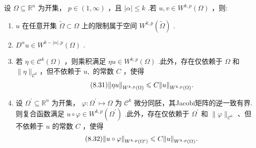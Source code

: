 \begin{theorem}[弱导数的性质]\label{thm:weak-derivative-properties}
设 $\Omega  \subseteq  {\mathbb{R}}^{n}$ 为开集， $p \in  \left(  {1,\infty }\right)$ ，且 $\left| \alpha \right|  \leq  k$ .若 $u,v \in  {W}^{k,p}\left( \Omega \right)$ ，则:
\begin{enumerate}
    \item $u$ 在任意开集 $\widetilde{\Omega } \subset  \Omega$ 上的限制属于空间 ${W}^{k,p}\left( \widetilde{\Omega }\right)$ .
    \item ${D}^{\alpha }u \in  {W}^{k - \left| \alpha \right| ,p}\left( \Omega \right)$ .
    \item 若 $\eta  \in  {\mathcal{C}}^{k}\left( \Omega \right)$ ，则乘积满足 ${\eta u} \in  {W}^{k,p}\left( \Omega \right)$ .此外，存在仅依赖于 $\Omega$ 和 $\| \eta {\| }_{{\mathcal{C}}^{k}}$，但不依赖于 $u,$ 的常数 $C$ ，使得
\begin{equation}\tag{8.31}\label{eq:eta-u-Wkp-estimate}
\norm{\eta u}_{{W}^{k,p}\left( \Omega \right) } \leqslant C\norm{u}_{{W}^{k,p}\left( \Omega \right) }.
\end{equation}
    \item 设 ${\Omega }^{\prime } \subseteq  {\mathbb{R}}^{n}$ 为开集， $\varphi  : {\Omega }^{\prime } \mapsto  \Omega$ 为 ${\mathcal{C}}^{k}$ 微分同胚，其Jacobi矩阵的逆一致有界.则复合函数满足 $u \circ  \varphi  \in  {W}^{k,p}\left( {\Omega }^{\prime }\right)$ .此外，存在仅依赖于 ${\Omega }^{\prime }$ 和 $\| \varphi {\| }_{{\mathcal{C}}^{k}}$ 、但不依赖于 $u$ 的常数 $C$ ，使得
\begin{equation}\tag{8.32}\label{eq:composition-Wkp-estimate}
\norm{u \circ  \varphi }_{{W}^{k,p}\left( {\Omega }^{\prime }\right) }\leqslant  C\norm{u}_{{W}^{k,p}\left( \Omega \right) }.
\end{equation}
\end{enumerate}
\end{theorem}

